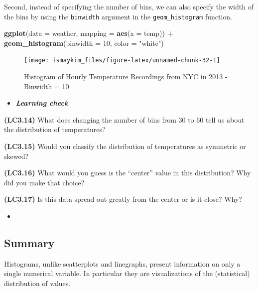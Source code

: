 \documentclass[12pt,]{krantz}
\makeatletter
\newenvironment{Shaded}{\begin{snugshade}}{\end{snugshade}}
\newcommand{\KeywordTok}[1]{\textcolor[rgb]{0.27,0.27,0.27}{\textbf{#1}}}
\newcommand{\DataTypeTok}[1]{\textcolor[rgb]{0.27,0.27,0.27}{#1}}
\newcommand{\DecValTok}[1]{\textcolor[rgb]{0.06,0.06,0.06}{#1}}
\newcommand{\StringTok}[1]{\textcolor[rgb]{0.5,0.5,0.5}{#1}}
\newcommand{\OperatorTok}[1]{\textcolor[rgb]{0.43,0.43,0.43}{\textbf{#1}}}
\newcommand{\NormalTok}[1]{#1}
\newenvironment{kframe}{%
\medskip{}
\setlength{\fboxsep}{.8em}
 \def\at@end@of@kframe{}%
 \ifinner\ifhmode%
  \def\at@end@of@kframe{\end{minipage}}%
  \begin{minipage}{\columnwidth}%
 \fi\fi%
 \def\FrameCommand##1{\hskip\@totalleftmargin \hskip-\fboxsep
 \colorbox{shadecolor}{##1}\hskip-\fboxsep
     \hskip-\linewidth \hskip-\@totalleftmargin \hskip\columnwidth}%
 \MakeFramed {\advance\hsize-\width
   \@totalleftmargin\z@ \linewidth\hsize
   \@setminipage}}%
 {\par\unskip\endMakeFramed%
 \at@end@of@kframe}
\renewenvironment{Shaded}{\begin{kframe}}{\end{kframe}}
\newenvironment{rmdblock}[1]
  {\begin{shaded*}
  \begin{itemize}
  \renewcommand{\labelitemi}{
    \raisebox{-.7\height}[0pt][0pt]{
    }
  }
  \item
  }
  {
  \end{itemize}
  \end{shaded*}
  }
\newenvironment{learncheck}
  {\begin{rmdblock}{warning}}
  {\end{rmdblock}}
\theoremstyle{definition}
\theoremstyle{definition}
\theoremstyle{definition}
\theoremstyle{remark}
\makeatother
\begin{document}
Second, instead of specifying the number of bins, we can also specify
the width of the bins by using the \texttt{binwidth} argument in the
\texttt{geom\_histogram} function.

\begin{Shaded}
\begin{Highlighting}[]
\KeywordTok{ggplot}\NormalTok{(}\DataTypeTok{data =}\NormalTok{ weather, }\DataTypeTok{mapping =} \KeywordTok{aes}\NormalTok{(}\DataTypeTok{x =}\NormalTok{ temp)) }\OperatorTok{+}
\StringTok{  }\KeywordTok{geom_histogram}\NormalTok{(}\DataTypeTok{binwidth =} \DecValTok{10}\NormalTok{, }\DataTypeTok{color =} \StringTok{"white"}\NormalTok{)}
\end{Highlighting}
\end{Shaded}

\begin{figure}

{\centering \texttt{[image: ismaykim\_files/figure-latex/unnamed-chunk-32-1]} 

}

\caption{Histogram of Hourly Temperature Recordings from NYC in 2013 - Binwidth = 10}\label{fig:unnamed-chunk-32}
\end{figure}

\begin{learncheck}
\textbf{\emph{Learning check}}
\end{learncheck}

\textbf{(LC3.14)} What does changing the number of bins from 30 to 60
tell us about the distribution of temperatures?

\textbf{(LC3.15)} Would you classify the distribution of temperatures as
symmetric or skewed?

\textbf{(LC3.16)} What would you guess is the ``center'' value in this
distribution? Why did you make that choice?

\textbf{(LC3.17)} Is this data spread out greatly from the center or is
it close? Why?

\begin{learncheck}

\end{learncheck}

\subsection{Summary}\label{summary-2}

Histograms, unlike scatterplots and linegraphs, present information on
only a single numerical variable. In particular they are visualizations
of the (statistical) distribution of values.
\end{document}
